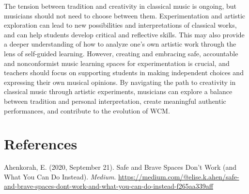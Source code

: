 \documentclass[authordate, empirical, issue]{jote-new-article}
\begin{document}
The tension between tradition and creativity in classical music is ongoing, but musicians should not need to choose between them. Experimentation and artistic exploration can lead to new possibilities and interpretations of classical works, and can help students develop critical and reflective skills. This may also provide a deeper understanding of how to analyze one's own artistic work through the lens of self-guided learning. However, creating and embracing safe, accountable and nonconformist music learning spaces for experimentation is crucial, and teachers should focus on supporting students in making independent choices and expressing their own musical opinions. By navigating the path to creativity in classical music through artistic experiments, musicians can explore a balance between tradition and personal interpretation, create meaningful authentic performances, and contribute to the evolution of WCM.















































\section{References}


\hspace*{\parindent} Ahenkorah, E. (2020, September 21). Safe and Brave Spaces Don't Work (and What You Can Do Instead). \emph{Medium}. \href{https://medium.com/@elise.k.ahen/safe-and-brave-spaces-dont-work-and-what-you-can-do-instead-f265aa339aff}{https://medium.com/@elise.k.ahen/safe-and-brave-spaces-dont-work-and-what-you-can-do-instead-f265aa339aff}
\end{document}
